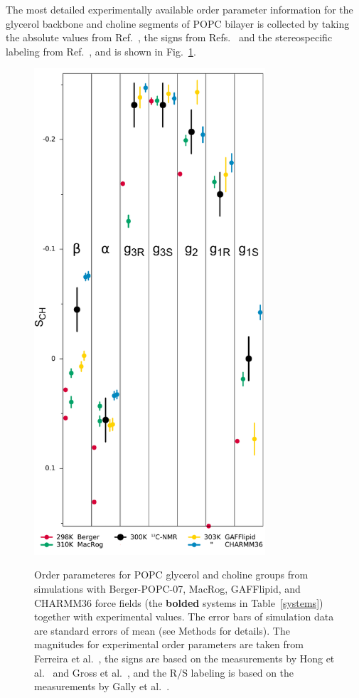 \documentclass[journal=jpcbfk,manuscript=article]{achemso}
\begin{document}
The most detailed experimentally available order parameter information for the glycerol backbone and choline 
segments of POPC bilayer is collected by taking the absolute values from Ref.~, the signs from Refs.~ 
and the stereospecific labeling from Ref.~, and is shown in Fig.~\ref{HGorderparameters2}.
\begin{figure}[]
  \centering
  \includegraphics[width=8.6cm]{../Fig/stereospecificOPs.pdf} \\
  \caption{\label{HGorderparameters2}
  Order parameteres for POPC glycerol and choline groups
  from simulations with Berger-POPC-07, MacRog, GAFFlipid, and CHARMM36 force fields
  (the {\bf bolded} systems in Table~\ref{systems})
  together with experimental values.
  The error bars of simulation data are standard errors of mean (see Methods for details).
  The magnitudes for experimental order parameters are taken from Ferreira et al.~\cite{ferreira13},
  the signs are based on the measurements by Hong et al.~\cite{hong95a,hong95b} 
  and Gross et al.~\cite{gross97}, and the R/S labeling is based on the measurements by Gally et al.~\cite{gally81}.
}
\end{figure}
\end{document}
